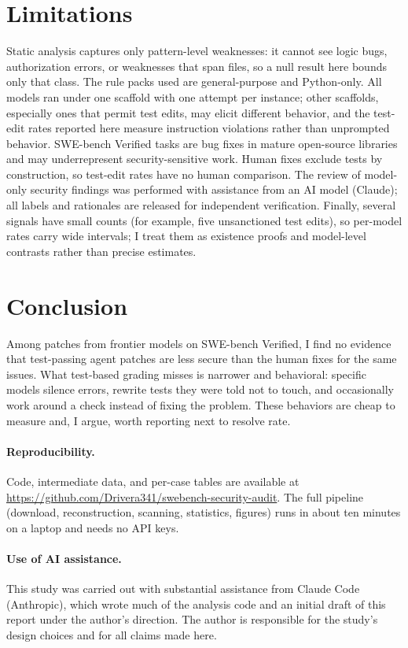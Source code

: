 \documentclass[10pt]{article}
\begin{document}
\section{Limitations}

Static analysis captures only pattern-level weaknesses: it cannot see logic bugs, authorization errors, or weaknesses that span files, so a null result here bounds only that class. The rule packs used are general-purpose and Python-only. All models ran under one scaffold with one attempt per instance; other scaffolds, especially ones that permit test edits, may elicit different behavior, and the test-edit rates reported here measure instruction violations rather than unprompted behavior. SWE-bench Verified tasks are bug fixes in mature open-source libraries and may underrepresent security-sensitive work. Human fixes exclude tests by construction, so test-edit rates have no human comparison. The review of model-only security findings was performed with assistance from an AI model (Claude); all labels and rationales are released for independent verification. Finally, several signals have small counts (for example, five unsanctioned test edits), so per-model rates carry wide intervals; I treat them as existence proofs and model-level contrasts rather than precise estimates.

\section{Conclusion}

Among \NModelPatches{} patches from \NModels{} frontier models on SWE-bench Verified, I find no evidence that test-passing agent patches are less secure than the human fixes for the same issues. What test-based grading misses is narrower and behavioral: specific models silence errors, rewrite tests they were told not to touch, and occasionally work around a check instead of fixing the problem. These behaviors are cheap to measure and, I argue, worth reporting next to resolve rate.

\paragraph{Reproducibility.} Code, intermediate data, and per-case tables are available at \url{https://github.com/Drivera341/swebench-security-audit}. The full pipeline (download, reconstruction, scanning, statistics, figures) runs in about ten minutes on a laptop and needs no API keys.

\paragraph{Use of AI assistance.} This study was carried out with substantial assistance from Claude Code (Anthropic), which wrote much of the analysis code and an initial draft of this report under the author's direction. The author is responsible for the study's design choices and for all claims made here.
\end{document}
